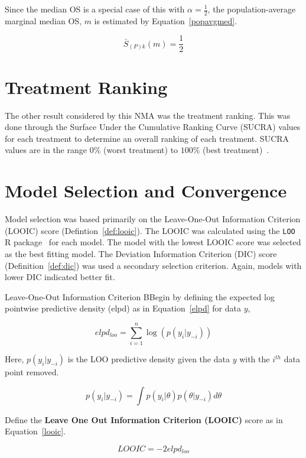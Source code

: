Since the median OS is a special case of this with $\alpha = \frac{1}{2}$, the population-average marginal median OS, $m$ is estimated by Equation~\ref{popavgmed}. 

\begin{equation}
    \bar{S}_{(P)k}(m) = \frac{1}{2}
    \label{popavgmed}
\end{equation}

\section{Treatment Ranking}
The other result considered by this NMA was the treatment ranking. This was done through the Surface Under the Cumulative Ranking Curve (SUCRA) values for each treatment to determine an overall ranking of each treatment. SUCRA values are in the range $0\%$ (worst treatment) to $100\%$ (best treatment)~\cite{mbuag}.

\section{Model Selection and Convergence}
Model selection was based primarily on the Leave-One-Out Information Criterion (LOOIC) score (Defintion~\ref{def:looic}). The LOOIC was calculated using the \verb|LOO| R package~\cite{loo} for each model. The model with the lowest LOOIC score was selected as the best fitting model. The Deviation Information Criterion (DIC) score (Definition~\ref{def:dic}) was used a secondary selection criterion. Again, models with lower DIC indicated better fit.

\begin{definition}[label=def:looic]{Leave-One-Out Information Criterion}
    BBegin by defining the expected log pointwise predictive density (elpd) as in Equation~\ref{elpd} for data $y$,
    
    \begin{equation}
        elpd_{loo} = \sum_{i = 1}^n \log(p(y_i | y_{-i}))
        \label{elpd}
    \end{equation}
    
    Here, $p(y_i|y_{-i})$ is the LOO predictive density given the data $y$ with the $i^{th}$ data point removed.
    
    \begin{equation}
        p(y_i | y_{-i}) = \int p(y_i|\theta)p(\theta|y_{-i})d\theta
        \label{loopd}
    \end{equation}
    
    Define the \textbf{Leave One Out Information Criterion (LOOIC)} score as in Equation~\ref{looic}.
    
    \begin{equation}
        LOOIC = -2elpd_{loo}
        \label{looic}
    \end{equation}
\end{definition}

